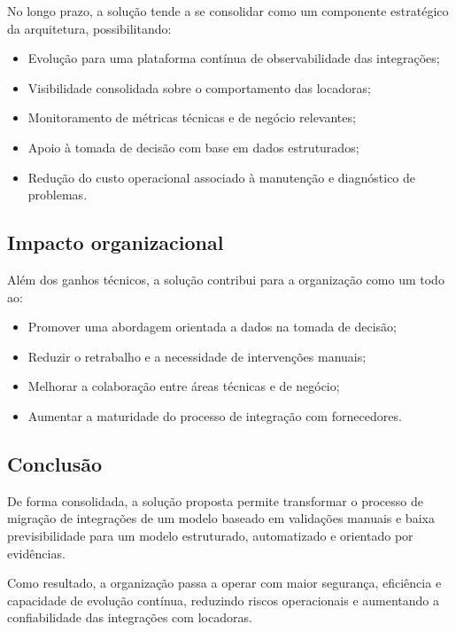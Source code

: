 No longo prazo, a solução tende a se consolidar como um componente estratégico da arquitetura, possibilitando:
\begin{itemize}
    \item Evolução para uma plataforma contínua de observabilidade das integrações;
    \item Visibilidade consolidada sobre o comportamento das locadoras;
    \item Monitoramento de métricas técnicas e de negócio relevantes;
    \item Apoio à tomada de decisão com base em dados estruturados;
    \item Redução do custo operacional associado à manutenção e diagnóstico de problemas.
\end{itemize}

\subsection{Impacto organizacional}

Além dos ganhos técnicos, a solução contribui para a organização como um todo ao:
\begin{itemize}
    \item Promover uma abordagem orientada a dados na tomada de decisão;
    \item Reduzir o retrabalho e a necessidade de intervenções manuais;
    \item Melhorar a colaboração entre áreas técnicas e de negócio;
    \item Aumentar a maturidade do processo de integração com fornecedores.
\end{itemize}

\subsection{Conclusão}

De forma consolidada, a solução proposta permite transformar o processo de migração de integrações de um modelo baseado em validações manuais e baixa previsibilidade para um modelo estruturado, automatizado e orientado por evidências.

Como resultado, a organização passa a operar com maior segurança, eficiência e capacidade de evolução contínua, reduzindo riscos operacionais e aumentando a confiabilidade das integrações com locadoras.